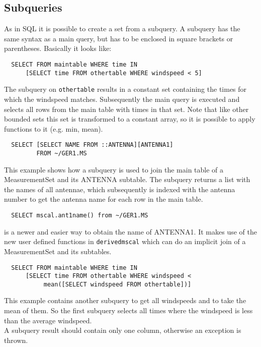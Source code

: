 \subsection{\label{TAQL:SUBQUERIES}Subqueries}
As in SQL it is possible to create a set from a subquery. A
subquery has the same syntax as a main query, but has to be
enclosed in square brackets or parentheses. Basically it looks like:
\begin{verbatim}
  SELECT FROM maintable WHERE time IN
      [SELECT time FROM othertable WHERE windspeed < 5]
\end{verbatim}
The subquery on \texttt{othertable} results in a constant set
containing the times
for which the windspeed matches. Subsequently the main query
is executed and selects all rows from the main table with times in
that set.
Note that like other bounded sets this set is transformed to a
constant array, so it is possible to apply functions to it (e.g. min,
mean).

\begin{verbatim}
  SELECT [SELECT NAME FROM ::ANTENNA][ANTENNA1]
         FROM ~/GER1.MS 
\end{verbatim}
This example shows how a subquery is used to join the main table of a
MeasurementSet and its ANTENNA subtable. The subquery returns a list
with the names of all antennae, which subsequently is indexed with the
antenna number to get the antenna name for each row in the main table.

\begin{verbatim}
  SELECT mscal.ant1name() from ~/GER1.MS
\end{verbatim}
is a newer and easier way to obtain the name of ANTENNA1. It makes use
of the new user defined functions in \texttt{derivedmscal} which can do an
implicit join of a MeasurementSet and its subtables.

\begin{verbatim}
  SELECT FROM maintable WHERE time IN
      [SELECT time FROM othertable WHERE windspeed <
           mean([SELECT windspeed FROM othertable])]
\end{verbatim}
This example contains another subquery to get all windspeeds and
to take the mean of them. So the first subquery selects all times
where the windspeed is less than the average windspeed.
\\A subquery result should contain only one column, otherwise
an exception is thrown.

